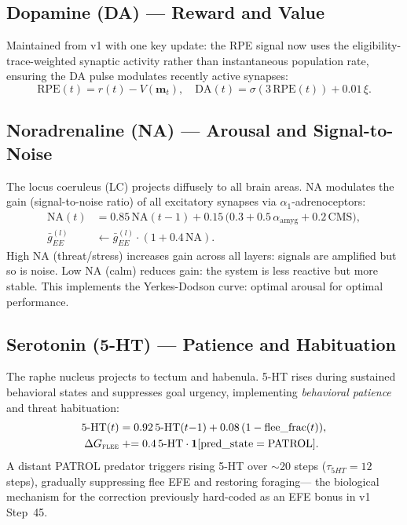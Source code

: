 \documentclass[11pt,a4paper]{article}
\begin{document}
\subsection{Dopamine (DA) — Reward and Value}

Maintained from v1 with one key update: the RPE signal now uses the
eligibility-trace-weighted synaptic activity rather than instantaneous
population rate, ensuring the DA pulse modulates recently active synapses:
\begin{equation}\label{eq:da_v2}
  \text{RPE}(t) = r(t) - V(\mathbf{m}_t),
  \quad
  \text{DA}(t) = \sigma(3\,\text{RPE}(t)) + 0.01\,\xi.
\end{equation}

\subsection{Noradrenaline (NA) — Arousal and Signal-to-Noise}

The locus coeruleus (LC) projects diffusely to all brain areas.
NA modulates the gain (signal-to-noise ratio) of all excitatory synapses
via $\alpha_1$-adrenoceptors:
\begin{equation}\label{eq:na}
\begin{aligned}
  \text{NA}(t) &= 0.85\,\text{NA}(t{-}1) + 0.15\,\bigl(0.3 + 0.5\,\alpha_\text{amyg}
    + 0.2\,\text{CMS}\bigr), \\
  \bar{g}_{EE}^{(l)} &\leftarrow \bar{g}_{EE}^{(l)} \cdot (1 + 0.4\,\text{NA}).
\end{aligned}
\end{equation}
High NA (threat/stress) increases gain across all layers:
signals are amplified but so is noise.
Low NA (calm) reduces gain: the system is less reactive but more stable.
This implements the Yerkes-Dodson curve: optimal arousal for optimal performance.

\subsection{Serotonin (5-HT) — Patience and Habituation}

The raphe nucleus projects to tectum and habenula.
5-HT rises during sustained behavioral states and suppresses goal urgency,
implementing \emph{behavioral patience} and threat habituation:
\begin{equation}\label{eq:serotonin}
\begin{aligned}
  \text{5-HT}(t) &= 0.92\,\text{5-HT}(t{-}1) + 0.08\,(1 - \text{flee\_frac}(t)), \\
  \Delta G_\textsc{flee} &\mathrel{+}= 0.4\,\text{5-HT} \cdot \mathbf{1}[\text{pred\_state}=\text{PATROL}].
\end{aligned}
\end{equation}
A distant PATROL predator triggers rising 5-HT over $\sim$20 steps
($\tau_{5HT} = 12$ steps), gradually suppressing flee EFE and restoring foraging---
the biological mechanism for the correction previously hard-coded
as an EFE bonus in v1 Step~45.
\end{document}
